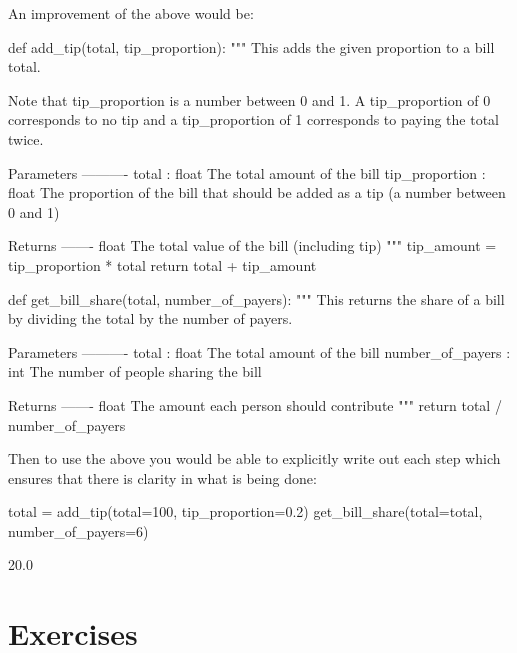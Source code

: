 An improvement of the above would be:

\begin{pyin}
def add_tip(total, tip_proportion):
    """
    This adds the given proportion to a bill total.

    Note that tip_proportion is a number between 0 and 1. A tip_proportion of 0
    corresponds to no tip and a tip_proportion of 1 corresponds to paying the
    total twice.

    Parameters
    ----------
    total : float
        The total amount of the bill
    tip_proportion : float
        The proportion of the bill that should be added as a tip (a number
        between 0 and 1)

    Returns
    -------
    float
        The total value of the bill (including tip)
    """
    tip_amount = tip_proportion * total
    return total + tip_amount


def get_bill_share(total, number_of_payers):
    """
    This returns the share of a bill by dividing the total by the number of
    payers.

    Parameters
    ----------
    total : float
        The total amount of the bill
    number_of_payers : int
        The number of people sharing the bill

    Returns
    -------
    float
        The amount each person should contribute
    """
    return total / number_of_payers
\end{pyin}


Then to use the above you would be able to explicitly write out each step which
ensures that there is clarity in what is being done:

\begin{pyin}
total = add_tip(total=100, tip_proportion=0.2)
get_bill_share(total=total, number_of_payers=6)
\end{pyin}

\begin{raw}
20.0
\end{raw}

\section{Exercises}
\label{\detokenize{building-tools/05-modularisation/exercises/main:exercises}}\label{\detokenize{building-tools/05-modularisation/exercises/main:modularisation-exercises}}\label{\detokenize{building-tools/05-modularisation/exercises/main::doc}}

